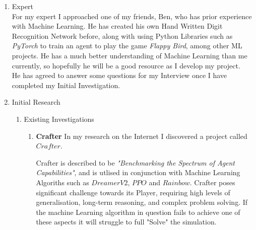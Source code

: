 \begin{flushleft}
\begin{enumerate}
        \vspace{1cm}
        \item {\Large Expert} \\
            \vspace{0.2cm}
            For my expert I approached one of my friends, Ben, who has prior experience with Machine Learning. He has
            created his own Hand Written Digit Recognition Network before, along with using Python Libraries such as 
            \textit{PyTorch} to train an agent to play the game \textit{Flappy Bird}, among other ML projects. He has 
            a much better understanding of Machine Learning than me currently, so hopefully he will be a good resource 
            as I develop my project. \\
            \vspace{0.2cm}
            He has agreed to answer some questions for my Interview once I have completed my Initial Investigation.

        \vspace{1cm}
        \item {\Large Initial Research} \\
            \begin{enumerate}
                \item {\Large Existing Investigations} \\
                    \begin{enumerate}
                        \item {\large \textbf{Crafter}}
                            In my research on the Internet I discovered a project called $Crafter$.
                            
                            \centerline{}

                            Crafter is described to be \textit{"Benchmarking the Spectrum of Agent Capabilities"}, and is utlised
                            in conjunction with Machine Learning Algoriths such as $DreamerV2$, $PPO$ and $Rainbow$. Crafter poses significant
                            challenge towards its Player, requiring high levels of generalisation, long-term reasoning, and complex 
                            problem solving. If the machine Learning algorithm in question fails to achieve one of these aspects it will 
                            struggle to full "Solve" the simulation. \\

                            \vspace{0.2cm}


\end{enumerate}
\end{enumerate}
\end{enumerate}
\end{flushleft}
